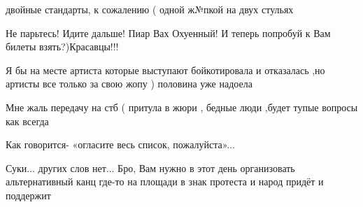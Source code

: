 \begin{itemize}
двойные стандарты, к сожалению ( одной ж№пкой на двух стульях

 
Не парьтесь! Идите дальше! Пиар Вах Охуенный! И теперь попробуй к Вам билеты взять?)Красавцы!!!

 
Я бы на месте артиста которые выступают бойкотировала и отказалась ,но артисты все только за свою жопу ) половина уже надоела

 
Мне жаль передачу на стб ( притула в жюри , бедные люди ,будет тупые вопросы как всегда

 
Как говорится- «огласите весь список, пожалуйста»...

 
Суки... других слов нет... Бро, Вам нужно в этот день организовать альтернативный канц где-то на площади в знак протеста и народ придёт и поддержит

 

\end{itemize}
